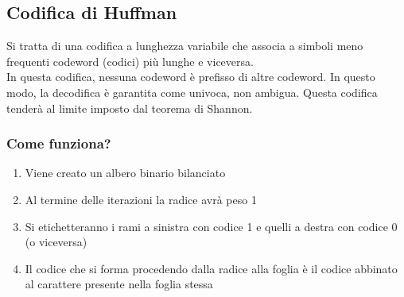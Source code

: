 \documentclass{report}
\begin{document}
	\subsection{Codifica di Huffman}
	Si tratta di una codifica a lunghezza variabile che associa a simboli meno frequenti codeword (codici) più lunghe e viceversa.\\
	In questa codifica, nessuna codeword è prefisso di altre codeword. In questo modo, la decodifica è garantita come univoca, non ambigua.
	Questa codifica tenderà al limite imposto dal teorema di Shannon.
	\subsubsection{Come funziona?}
	\begin{enumerate}
		\item Viene creato un albero binario bilanciato
		\item Al termine delle iterazioni la radice avrà peso 1
		\item Si etichetteranno i rami a sinistra con codice 1 e quelli a destra con codice 0 (o viceversa)
		\item Il codice che si forma procedendo dalla radice alla foglia è il codice abbinato al carattere presente nella foglia stessa
	\end{enumerate}
		
	\newpage
		
\end{document}

